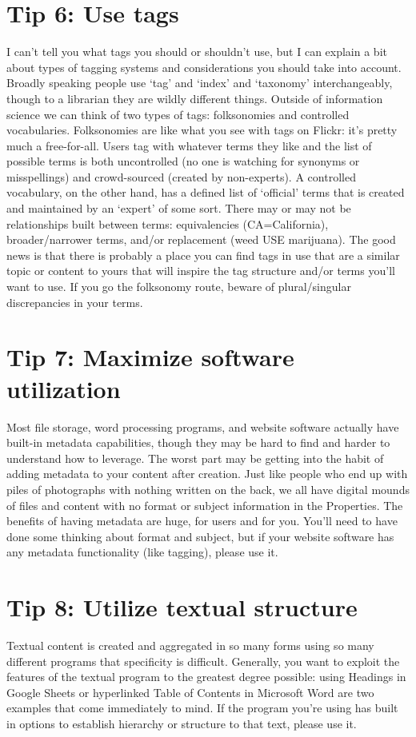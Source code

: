 \documentclass[10pt,letterpaper]{article}
\newcommand{\rulemajor}[1]{\section*{#1}}
\begin{document}
\rulemajor{Tip 6: Use tags}

I can't tell you what tags you should or shouldn't use,
but I can explain a bit about types of tagging systems and considerations you should take into account.
Broadly speaking people use `tag' and `index' and `taxonomy' interchangeably,
though to a librarian they are wildly different things.
Outside of information science we can think of two types of tags:
folksonomies and controlled vocabularies.
Folksonomies are like what you see with tags on Flickr:
it's pretty much a free-for-all.
Users tag with whatever terms they like and the list of possible terms is both uncontrolled (no one is watching for synonyms or misspellings)
and crowd-sourced (created by non-experts).
A controlled vocabulary,
on the other hand,
has a defined list of `official' terms that is created and maintained by an `expert' of some sort.
There may or may not be relationships built between terms:
equivalencies (CA=California), broader/narrower terms, and/or replacement (weed USE marijuana).
The good news is that there is probably a place you can find tags in use that are a similar topic or content to yours
that will inspire the tag structure and/or terms you'll want to use.
If you go the folksonomy route,
beware of plural/singular discrepancies in your terms.

\rulemajor{Tip 7: Maximize software utilization}

Most file storage, word processing programs, and website software actually have built-in metadata capabilities,
though they may be hard to find and harder to understand how to leverage.
The worst part may be getting into the habit of adding metadata to your content after creation.
Just like people who end up with piles of photographs with nothing written on the back,
we all have digital mounds of files and content with no format or subject information in the Properties.
The benefits of having metadata are huge, for users and for you.
You'll need to have done some thinking about format and subject,
but if your website software has any metadata functionality (like tagging),
please use it.

\rulemajor{Tip 8: Utilize textual structure}

Textual content is created and aggregated in so many forms using so many different programs that specificity is difficult.
Generally, you want to exploit the features of the textual program to the greatest degree possible:
using Headings in Google Sheets or hyperlinked Table of Contents in Microsoft Word are two examples that come immediately to mind.
If the program you're using has built in options to establish hierarchy or structure to that text, please use it.
\end{document}
